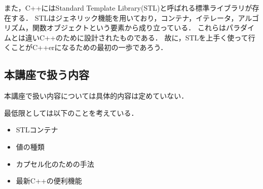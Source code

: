 また，C++にはStandard Template Library(STL)と呼ばれる標準ライブラリが存在する．
STLはジェネリック機能を用いており，コンテナ，イテレータ，アルゴリズム，関数オブジェクトという要素から成り立っている．
これらはパラダイムとは違いC++のために設計されたものである．
故に，STLを上手く使って行くことがC++erになるための最初の一歩であろう．


\subsection{本講座で扱う内容}
本講座で扱い内容については具体的内容は定めていない．

最低限としては以下のことを考えている．
\begin{itemize}
    \item STLコンテナ
    \item 値の種類
    \item カプセル化のための手法
    \item 最新C++の便利機能
\end{itemize}

